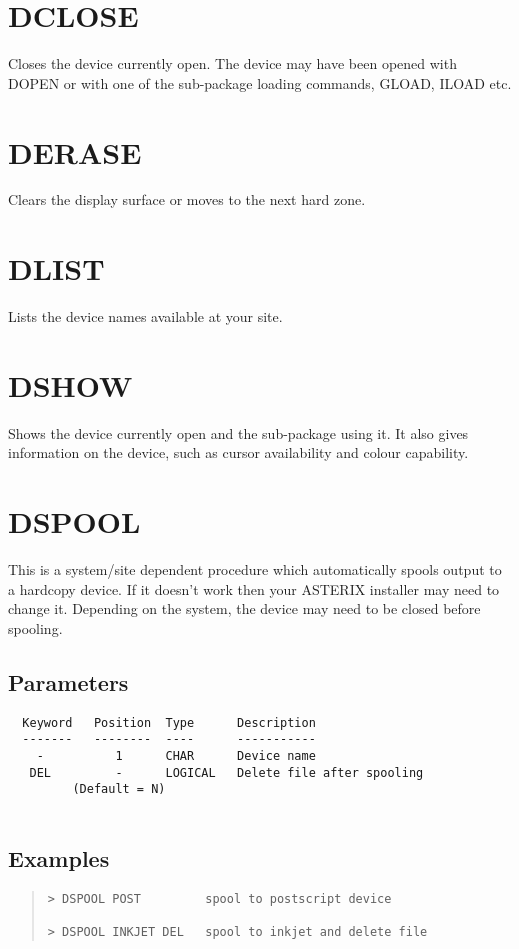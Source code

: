 \documentclass{book}
\renewcommand{\_}{{\tt\char'137}}     %
\begin{document}
\section{DCLOSE}
Closes the device currently open. The device may have been opened
with DOPEN or with one of the sub-package loading commands, GLOAD,
ILOAD etc.
 
\section{DERASE}
Clears the display surface or moves to the next hard zone.
 
\section{DLIST}
Lists the device names available at your site.
 
\section{DSHOW}
Shows the device currently open and the sub-package using it.
It also gives information on the device, such as cursor availability
and colour capability.
 
\section{DSPOOL}
This is a system/site dependent procedure which automatically
spools output to a hardcopy device. If it doesn't work then
your ASTERIX installer may need to change it. Depending on
the system, the device may need to be closed before spooling.
 
\subsection{Parameters}
\begin{verbatim}
  Keyword   Position  Type      Description
  -------   --------  ----      -----------
    -          1      CHAR      Device name
   DEL         -      LOGICAL   Delete file after spooling
         (Default = N)
 
\end{verbatim}\subsection{Examples}
\begin{quote}\begin{verbatim}
> DSPOOL POST         spool to postscript device
 
> DSPOOL INKJET DEL   spool to inkjet and delete file
\end{verbatim}\end{quote}
\end{document}
